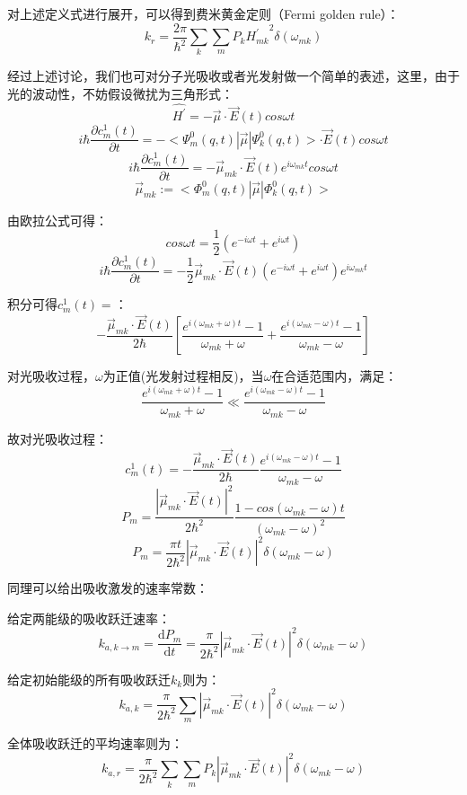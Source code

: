 对上述定义式进行展开，可以得到费米黄金定则（Fermi golden rule）：
\[k_r=\frac{2 \pi}{\hbar^2}\sum_k\sum_m P_k {H^{'}_{mk}}^2\delta(\omega_{mk})\]

经过上述讨论，我们也可对分子光吸收或者光发射做一个简单的表述，这里，由于光的波动性，不妨假设微扰为三角形式：
\[\hat{H^{'}}=-\overrightarrow{\mu} \cdot \overrightarrow{E}(t)cos\omega t\]
\[i \hbar \frac{\partial c_m^1(t)}{\partial t}=-<\varPsi_m^0(q,t)|\overrightarrow{\mu}|\varPsi_k^0(q,t)>\cdot \overrightarrow{E}(t)cos\omega t\]
\[i \hbar \frac{\partial c_m^1(t)}{\partial t}=-\overrightarrow{\mu}_{mk} \cdot \overrightarrow{E}(t) e^{i \omega_{mk}t}cos\omega t\]
\[\overrightarrow{\mu}_{mk}:=<\varPhi_m^0(q,t)|\overrightarrow{\mu}|\varPhi_k^0(q,t)>\]

由欧拉公式可得：
\[cos\omega t=\frac{1}{2}(e^{-i\omega t}+e^{i \omega t})\]
\[i \hbar \frac{\partial c_m^1(t)}{\partial t}=-\frac{1}{2}\overrightarrow{\mu}_{mk} \cdot \overrightarrow{E}(t)(e^{-i\omega t}+e^{i \omega t}) e^{i \omega_{mk}t}\]

积分可得$c_m^1(t)=$：
\[-\frac{\overrightarrow{\mu}_{mk} \cdot \overrightarrow{E}(t)}{2 \hbar}\left [\frac{e^{i(\omega_{mk}+\omega)t}-1}{\omega_{mk}+\omega}+\frac{e^{i(\omega_{mk}-\omega)t}-1}{\omega_{mk}-\omega} \right ]\]

对光吸收过程，$\omega$为正值(光发射过程相反)，当$\omega$在合适范围内，满足：
\[\frac{e^{i(\omega_{mk}+\omega)t}-1}{\omega_{mk} + \omega} \ll \frac{e^{i(\omega_{mk}-\omega)t}-1}{\omega_{mk}-\omega}\]

故对光吸收过程：
\[c_m^1(t)=-\frac{\overrightarrow{\mu}_{mk} \cdot \overrightarrow{E}(t)}{2 \hbar}\frac{e^{i(\omega_{mk}-\omega)t}-1}{\omega_{mk}-\omega}\]
\[P_m=\frac{|\overrightarrow{\mu}_{mk} \cdot \overrightarrow{E}(t)|^2}{2 \hbar^2}\frac{1-cos(\omega_{mk}-\omega)t}{(\omega_{mk}-\omega)^2}\]
\[P_m=\frac{\pi t}{2 \hbar^2}|\overrightarrow{\mu}_{mk} \cdot \overrightarrow{E}(t)|^2 \delta(\omega_{mk}-\omega)\]

同理可以给出吸收激发的速率常数：

给定两能级的吸收跃迁速率：
\[k_{a,k \rightarrow m}=\frac{\mathrm{d} P_m}{\mathrm{d}t}=\frac{\pi}{2 \hbar^2}|\overrightarrow{\mu}_{mk} \cdot \overrightarrow{E}(t)|^2 \delta(\omega_{mk}-\omega)\]

给定初始能级的所有吸收跃迁$k_{k}$则为：
\[k_{a,k}=\frac{\pi}{2 \hbar^2}\sum_m|\overrightarrow{\mu}_{mk} \cdot \overrightarrow{E}(t)|^2 \delta(\omega_{mk}-\omega)\]

全体吸收跃迁的平均速率则为：
\[k_{a,r}=\frac{\pi}{2 \hbar^2}\sum_k\sum_m P_k |\overrightarrow{\mu}_{mk} \cdot \overrightarrow{E}(t)|^2 \delta(\omega_{mk}-\omega)\]

